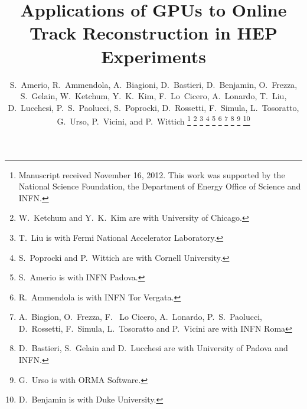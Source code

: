 \documentclass[journal]{IEEEtran}
\begin{document}
\title{Applications of GPUs to Online Track Reconstruction in HEP Experiments}
\author{S.~Amerio, R.~Ammendola, A.~Biagioni, D.~Bastieri, D.~Benjamin, 
O.~Frezza, S.~Gelain, W.~Ketchum, Y.~K.~Kim, F.~Lo~Cicero, A.~Lonardo, T.~Liu, D.~Lucchesi, P.~S.~Paolucci, S.~Poprocki, D.~Rossetti, F.~Simula, L.~Tosoratto, 
G.~Urso, P.~Vicini, and P.~Wittich
\thanks{Manuscript received November 16, 2012.
This work was supported by the National Science Foundation, the
Department of Energy Office of Science and INFN.}%
\thanks{W.~Ketchum and Y.~K.~Kim are with University of Chicago.}%
\thanks{T.~Liu is with Fermi National Accelerator Laboratory.}%
\thanks{S.~Poprocki and P.~Wittich are with Cornell University.}%
\thanks{S.~Amerio is with INFN Padova.}%
\thanks{R.~Ammendola is with INFN Tor Vergata.}%
\thanks{A.~Biagion, O.~Frezza,  F.~ Lo Cicero, A.~Lonardo, P.~S.~Paolucci, D.~Rossetti,  F.~Simula, L.~Tosoratto and P.~Vicini are with INFN Roma}%
\thanks{D.~Bastieri, S.~Gelain and D.~Lucchesi are with University of Padova and INFN.}%
\thanks{G.~Urso is with ORMA Software.}%
\thanks{D.~Benjamin is with Duke University.}%
}
\maketitle
\thispagestyle{empty}
\end{document}
